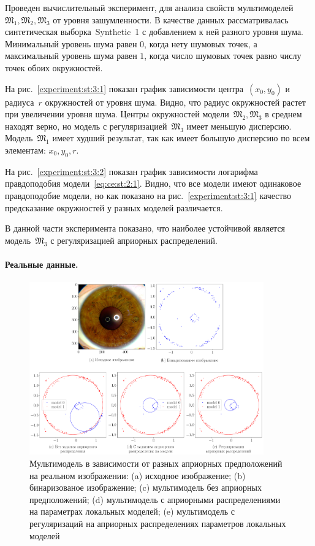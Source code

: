 \documentclass[12pt, twoside]{article}
\numberwithin{equation}{section}
\begin{document}
Проведен вычислительный эксперимент, для анализа свойств мультимоделей~$\mathfrak{M}_1, \mathfrak{M}_2, \mathfrak{M}_3$ от уровня зашумленности. В качестве данных рассматривалась синтетическая выборка~Synthetic~1 с добавлением к ней разного уровня шума. Минимальный уровень шума равен $0$, когда нету шумовых точек, а максимальный уровень шума равен $1$, когда число шумовых точек равно числу точек обоих окружностей.

На рис.~\ref{experiment:st:3:1} показан график зависимости центра~$(x_{0}, y_{0})$ и радиуса~$r$ окружностей от уровня шума. Видно, что радиус окружностей растет при увеличении уровня шума. Центры окружностей модели~$\mathfrak{M}_2, \mathfrak{M}_3$ в среднем находят верно, но модель с регуляризацией~$\mathfrak{M}_3$ имеет меньшую дисперсию. Модель~$\mathfrak{M}_1$ имеет худший результат, так как имеет большую дисперсию по всем элементам: $x_0, y_0, r$.

На рис.~\ref{experiment:st:3:2} показан график зависимости логарифма правдоподобия модели~\eqref{eq:ce:st:2:1}. Видно, что все модели имеют одинаковое правдоподобие модели, но как показано на рис.~\ref{experiment:st:3:1} качество предсказание окружностей у разных моделей различается.

В данной части эксперимента показано, что наиболее устойчивой является модель~$\mathfrak{M}_3$ с регуляризацией априорных распределений.

\paragraph{Реальные данные.}
\begin{figure}[h!t]\center
\includegraphics[width=0.9\textwidth]{result/experiment_real_compare}
\caption{Мультимодель в зависимости от разных априорных предположений на реальном изображении: (a) исходное изображение; (b) бинаризованое изображение; (c) мультимодель без априорных предположений; (d) мультимодель с априорными распределениями на параметрах локальных моделей; (e) мультимодель с регуляризаций на априорных распределениях параметров локальных моделей}
\label{experiment:2}
\end{figure}
\end{document}
